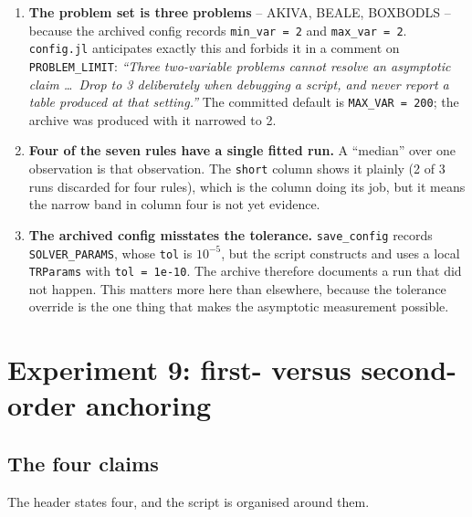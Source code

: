 \documentclass[11pt,a4paper]{article}
\newcommand{\jl}[1]{\texttt{\small #1}}
\newcommand{\file}[1]{\texttt{\small #1}}
\begin{document}
\begin{enumerate}[leftmargin=7mm,itemsep=3pt]
  \item \textbf{The problem set is three problems} -- AKIVA, BEALE, BOXBODLS --
        because the archived config records \jl{min\_var = 2} and \jl{max\_var = 2}.
        \file{config.jl} anticipates exactly this and forbids it in a comment on
        \jl{PROBLEM\_LIMIT}: \emph{``Three two-variable problems cannot resolve an
        asymptotic claim \dots\ Drop to 3 deliberately when debugging a script, and
        never report a table produced at that setting.''} The committed default is
        \jl{MAX\_VAR = 200}; the archive was produced with it narrowed to 2.
  \item \textbf{Four of the seven rules have a single fitted run.} A ``median'' over
        one observation is that observation. The \jl{short} column shows it plainly
        (2 of 3 runs discarded for four rules), which is the column doing its job,
        but it means the narrow band in column four is not yet evidence.
  \item \textbf{The archived config misstates the tolerance.} \jl{save\_config}
        records \jl{SOLVER\_PARAMS}, whose \jl{tol} is $10^{-5}$, but the script
        constructs and uses a local \jl{TRParams} with \jl{tol = 1e-10}. The
        archive therefore documents a run that did not happen. This matters more
        here than elsewhere, because the tolerance override is the one thing that
        makes the asymptotic measurement possible.
\end{enumerate}

\section{Experiment 9: first- versus second-order anchoring}

\subsection{The four claims}

The header states four, and the script is organised around them.
\end{document}
